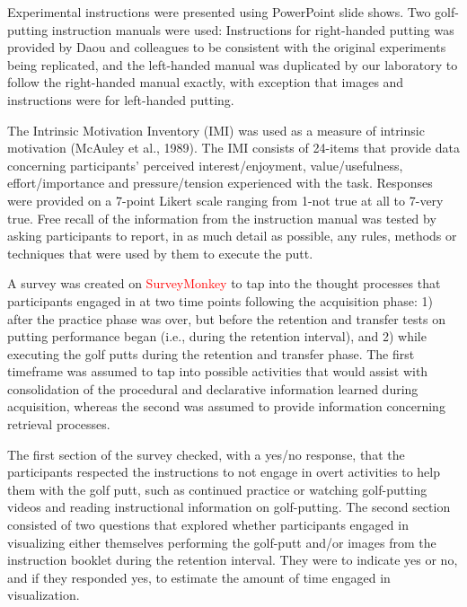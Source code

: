 \documentclass[
  english,
  man,floatsintext]{apa7}
\begin{document}
Experimental instructions were presented using PowerPoint slide shows. Two golf-putting instruction manuals were used: Instructions for right-handed putting was provided by Daou and colleagues to be consistent with the original experiments being replicated, and the left-handed manual was duplicated by our laboratory to follow the right-handed manual exactly, with exception that images and instructions were for left-handed putting.

The Intrinsic Motivation Inventory (IMI) was used as a measure of intrinsic motivation (McAuley et al., 1989). The IMI consists of 24-items that provide data concerning participants' perceived interest/enjoyment, value/usefulness, effort/importance and pressure/tension experienced with the task. Responses were provided on a 7-point Likert scale ranging from 1-not true at all to 7-very true. Free recall of the information from the instruction manual was tested by asking participants to report, in as much detail as possible, any rules, methods or techniques that were used by them to execute the putt.

A survey was created on \textcolor{red}{SurveyMonkey} to tap into the thought processes that participants engaged in at two time points following the acquisition phase: 1) after the practice phase was over, but before the retention and transfer tests on putting performance began (i.e., during the retention interval), and 2) while executing the golf putts during the retention and transfer phase. The first timeframe was assumed to tap into possible activities that would assist with consolidation of the procedural and declarative information learned during acquisition, whereas the second was assumed to provide information concerning retrieval processes.

The first section of the survey checked, with a yes/no response, that the participants respected the instructions to not engage in overt activities to help them with the golf putt, such as continued practice or watching golf-putting videos and reading instructional information on golf-putting. The second section consisted of two questions that explored whether participants engaged in visualizing either themselves performing the golf-putt and/or images from the instruction booklet during the retention interval. They were to indicate yes or no, and if they responded yes, to estimate the amount of time engaged in visualization.
\end{document}
